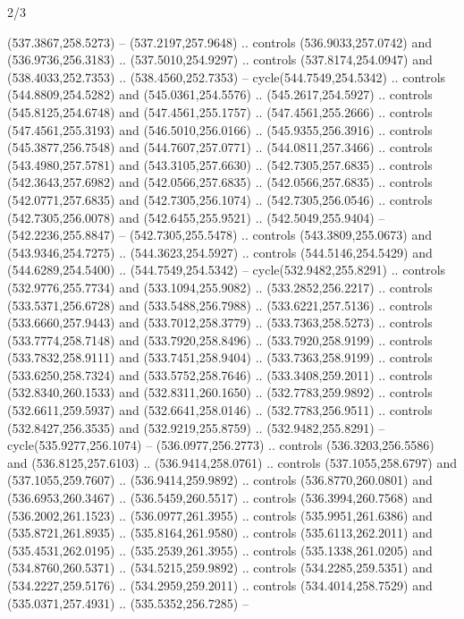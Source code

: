 \begin{flagdescription}{2/3}
\begin{scope}[xshift=0.5\flaglength,yshift=0.5\flagwidth,scale=\flagwidth/495.65]
\begin{scope}[y=0.8pt, x=0.8pt, yscale=-1,shift={(-463.76,-309.78)}]
  (537.3867,258.5273) -- (537.2197,257.9648) .. controls (536.9033,257.0742) and
  (536.9736,256.3183) .. (537.5010,254.9297) .. controls (537.8174,254.0947) and
  (538.4033,252.7353) .. (538.4560,252.7353) -- cycle(544.7549,254.5342) ..
  controls (544.8809,254.5282) and (545.0361,254.5576) .. (545.2617,254.5927) ..
  controls (545.8125,254.6748) and (547.4561,255.1757) .. (547.4561,255.2666) ..
  controls (547.4561,255.3193) and (546.5010,256.0166) .. (545.9355,256.3916) ..
  controls (545.3877,256.7548) and (544.7607,257.0771) .. (544.0811,257.3466) ..
  controls (543.4980,257.5781) and (543.3105,257.6630) .. (542.7305,257.6835) ..
  controls (542.3643,257.6982) and (542.0566,257.6835) .. (542.0566,257.6835) ..
  controls (542.0771,257.6835) and (542.7305,256.1074) .. (542.7305,256.0546) ..
  controls (542.7305,256.0078) and (542.6455,255.9521) .. (542.5049,255.9404) --
  (542.2236,255.8847) -- (542.7305,255.5478) .. controls (543.3809,255.0673) and
  (543.9346,254.7275) .. (544.3623,254.5927) .. controls (544.5146,254.5429) and
  (544.6289,254.5400) .. (544.7549,254.5342) -- cycle(532.9482,255.8291) ..
  controls (532.9776,255.7734) and (533.1094,255.9082) .. (533.2852,256.2217) ..
  controls (533.5371,256.6728) and (533.5488,256.7988) .. (533.6221,257.5136) ..
  controls (533.6660,257.9443) and (533.7012,258.3779) .. (533.7363,258.5273) ..
  controls (533.7774,258.7148) and (533.7920,258.8496) .. (533.7920,258.9199) ..
  controls (533.7832,258.9111) and (533.7451,258.9404) .. (533.7363,258.9199) ..
  controls (533.6250,258.7324) and (533.5752,258.7646) .. (533.3408,259.2011) ..
  controls (532.8340,260.1533) and (532.8311,260.1650) .. (532.7783,259.9892) ..
  controls (532.6611,259.5937) and (532.6641,258.0146) .. (532.7783,256.9511) ..
  controls (532.8427,256.3535) and (532.9219,255.8759) .. (532.9482,255.8291) --
  cycle(535.9277,256.1074) -- (536.0977,256.2773) .. controls
  (536.3203,256.5586) and (536.8125,257.6103) .. (536.9414,258.0761) .. controls
  (537.1055,258.6797) and (537.1055,259.7607) .. (536.9414,259.9892) .. controls
  (536.8770,260.0801) and (536.6953,260.3467) .. (536.5459,260.5517) .. controls
  (536.3994,260.7568) and (536.2002,261.1523) .. (536.0977,261.3955) .. controls
  (535.9951,261.6386) and (535.8721,261.8935) .. (535.8164,261.9580) .. controls
  (535.6113,262.2011) and (535.4531,262.0195) .. (535.2539,261.3955) .. controls
  (535.1338,261.0205) and (534.8760,260.5371) .. (534.5215,259.9892) .. controls
  (534.2285,259.5351) and (534.2227,259.5176) .. (534.2959,259.2011) .. controls
  (534.4014,258.7529) and (535.0371,257.4931) .. (535.5352,256.7285) --

\end{scope}
\end{scope}
\end{flagdescription}
